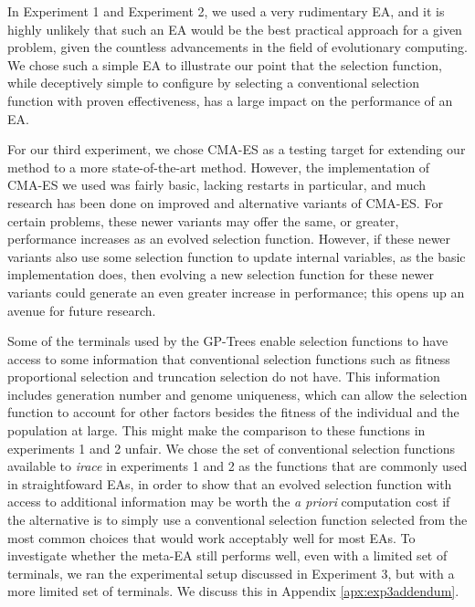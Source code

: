 \documentclass[times,12pt,titlepage]{mstogs}
\begin{document}
\begin{ThesisBody}
In Experiment 1 and Experiment 2, we used a very rudimentary EA, and it is highly unlikely that such an EA would be the best practical approach for a given problem, given the countless advancements in the field of evolutionary computing. We chose such a simple EA to illustrate our point that the selection function, while deceptively simple to configure by selecting a conventional selection function with proven effectiveness, has a large impact on the performance of an EA.

For our third experiment, we chose CMA-ES as a testing target for extending our method to a more state-of-the-art method. However, the implementation of CMA-ES we used was fairly basic, lacking restarts in particular, and much research has been done on improved and alternative variants of CMA-ES. For certain problems, these newer variants may offer the same, or greater, performance increases as an evolved selection function. However, if these newer variants also use some selection function to update internal variables, as the basic implementation does, then evolving a new selection function for these newer variants could generate an even greater increase in performance; this opens up an avenue for future research.

Some of the terminals used by the GP-Trees enable selection functions to have access to some information that conventional selection functions such as fitness proportional selection and truncation selection do not have. This information includes generation number and genome uniqueness, which can allow the selection function to account for other factors besides the fitness of the individual and the population at large. This might make the comparison to these functions in experiments 1 and 2 unfair. We chose the set of conventional selection functions available to \textit{irace} in experiments 1 and 2 as the functions that are commonly used in straightfoward EAs, in order to show that an evolved selection function with access to additional information may be worth the \textit{a priori} computation cost if the alternative is to simply use a conventional selection function selected from the most common choices that would work acceptably well for most EAs. To investigate whether the meta-EA still performs well, even with a limited set of terminals, we ran the experimental setup discussed in Experiment 3, but with a more limited set of terminals. We discuss this in Appendix \ref{apx:exp3addendum}.




\end{ThesisBody}
\end{document}
